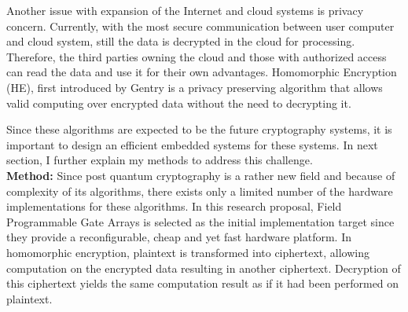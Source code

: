 \documentclass[12pt,oneside]{book}
\begin{document}
Another issue with expansion of the Internet and cloud systems is privacy concern. 
 Currently, with the most secure communication between user computer and cloud system, still the data is decrypted in the cloud for processing. Therefore, the third parties owning the cloud and those with authorized access can read the data and use it for their own advantages. Homomorphic Encryption (HE), first introduced by Gentry  is a privacy preserving algorithm that allows valid computing over encrypted data without the need to decrypting it. 
 
 Since these algorithms are expected to be the future  cryptography systems, it is important to design an efficient  embedded systems for these systems. In next section,
 I further explain my methods to address this challenge. \\
{\bf Method: } 
Since  post quantum cryptography is a rather new field and because of  complexity of its algorithms, there exists only a limited number of the hardware implementations for these algorithms. 
 In this research proposal, Field Programmable Gate Arrays is selected as the initial implementation target since they provide a  reconfigurable, cheap and yet fast hardware platform. 
  In homomorphic encryption, plaintext is transformed into ciphertext, allowing computation on the encrypted data resulting in another ciphertext. Decryption of this ciphertext yields the same computation result as if it had been performed on plaintext.
\end{document}
